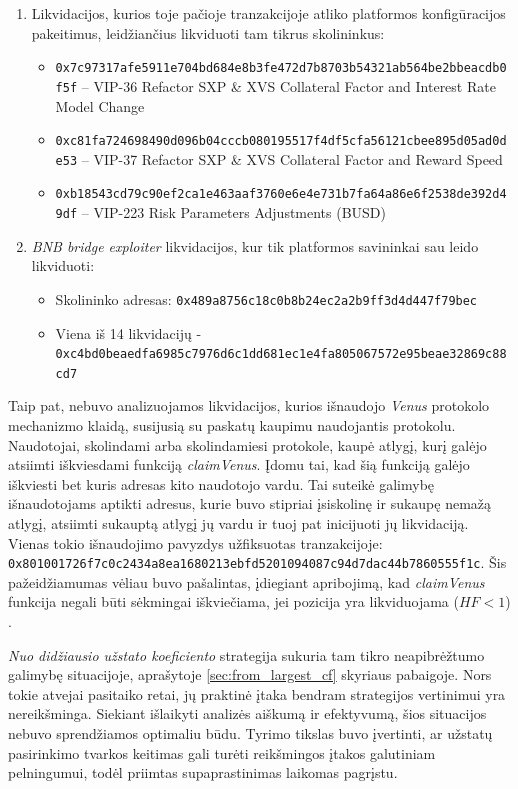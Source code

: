 \documentclass[]{VUMIFTemplateClass}
\begin{document}
\begin{enumerate}
    \item Likvidacijos, kurios toje pačioje tranzakcijoje atliko platformos konfigūracijos pakeitimus, leidžiančius likviduoti tam tikrus skolininkus:
    \begin{itemize}
        \item \texttt{0x7c97317afe5911e704bd684e8b3fe472d7b8703b54321ab564be2bbeacdb0f5f} – VIP-36 Refactor SXP \& XVS Collateral Factor and Interest Rate Model Change
        \item \texttt{0xc81fa724698490d096b04cccb080195517f4df5cfa56121cbee895d05ad0de53} – VIP-37 Refactor SXP \& XVS Collateral Factor and Reward Speed
        \item \texttt{0xb18543cd79c90ef2ca1e463aaf3760e6e4e731b7fa64a86e6f2538de392d49df} – VIP-223 Risk Parameters Adjustments (BUSD)
    \end{itemize}
    \item \textit{BNB bridge exploiter} likvidacijos, kur tik platformos savininkai sau leido likviduoti:
    \begin{itemize}
        \item Skolininko adresas: \texttt{0x489a8756c18c0b8b24ec2a2b9ff3d4d447f79bec}
        \item Viena iš 14 likvidacijų - \\\texttt{0xc4bd0beaedfa6985c7976d6c1dd681ec1e4fa805067572e95beae32869c88cd7}
    \end{itemize}
\end{enumerate}

Taip pat, nebuvo analizuojamos likvidacijos, kurios išnaudojo \textit{Venus} protokolo mechanizmo klaidą, susijusią su paskatų kaupimu naudojantis protokolu. Naudotojai, skolindami arba skolindamiesi protokole, kaupė atlygį, kurį galėjo atsiimti iškviesdami funkciją \textit{claimVenus}. Įdomu tai, kad šią funkciją galėjo iškviesti bet kuris adresas kito naudotojo vardu. Tai suteikė galimybę išnaudotojams aptikti adresus, kurie buvo stipriai įsiskolinę ir sukaupę nemažą atlygį, atsiimti sukauptą atlygį jų vardu ir tuoj pat inicijuoti jų likvidaciją. Vienas tokio išnaudojimo pavyzdys užfiksuotas tranzakcijoje: \texttt{0x801001726f7c0c2434a8ea1680213ebfd5201094087c94d7dac44b7860555f1c}. Šis pažeidžiamumas vėliau buvo pašalintas, įdiegiant apribojimą, kad \textit{claimVenus} funkcija negali būti sėkmingai iškviečiama, jei pozicija yra likviduojama ($HF < 1$) \cite{exploitFix}.

\textit{Nuo didžiausio užstato koeficiento} strategija sukuria tam tikro neapibrėžtumo galimybę situacijoje, aprašytoje \ref{sec:from_largest_cf} skyriaus pabaigoje. Nors tokie atvejai pasitaiko retai, jų praktinė įtaka bendram strategijos vertinimui yra nereikšminga. Siekiant išlaikyti analizės aiškumą ir efektyvumą, šios situacijos nebuvo sprendžiamos optimaliu būdu. Tyrimo tikslas buvo įvertinti, ar užstatų pasirinkimo tvarkos keitimas gali turėti reikšmingos įtakos galutiniam pelningumui, todėl priimtas supaprastinimas laikomas pagrįstu.
\end{document}
